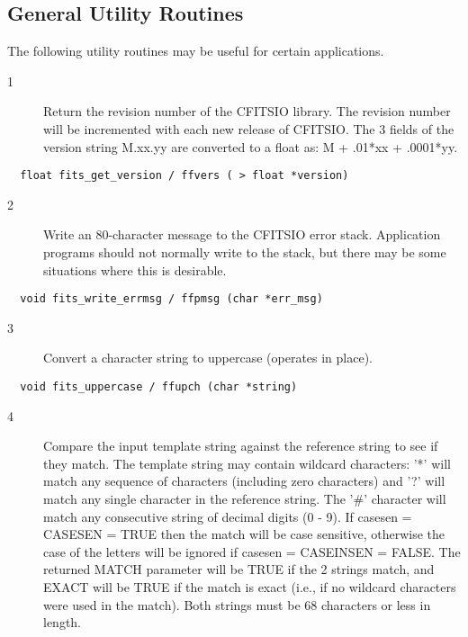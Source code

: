 \documentclass[11pt]{book}
\begin{document}
\subsection{General Utility Routines}

The following utility routines may be useful for certain applications.


\begin{description}
\item[1 ] Return the revision number of the CFITSIO library.
    The revision number will be incremented with each new
   release of CFITSIO. The 3 fields of the version string M.xx.yy
   are converted to a float as: M + .01*xx + .0001*yy. \label{ffvers}
\end{description}

\begin{verbatim}
  float fits_get_version / ffvers ( > float *version)
\end{verbatim}

\begin{description}
\item[2 ] Write an 80-character message to the CFITSIO error stack.  Application
    programs should not normally write to the stack, but there may be
   some situations where this is desirable. \label{ffpmsg}
\end{description}

\begin{verbatim}
  void fits_write_errmsg / ffpmsg (char *err_msg)
\end{verbatim}

\begin{description}
\item[3 ] Convert a character string to uppercase (operates in place). \label{ffupch}
\end{description}

\begin{verbatim}
  void fits_uppercase / ffupch (char *string)
\end{verbatim}

\begin{description}
\item[4 ] Compare the input template string against the reference string
    to see if they match.  The template string may contain wildcard
    characters: '*' will match any sequence of characters (including
    zero characters) and '?' will match any single character in the
    reference string.  The '\#' character will match any consecutive string
    of decimal digits (0 - 9).  If casesen = CASESEN = TRUE then the match will
    be case sensitive, otherwise the case of the letters will be ignored
    if casesen = CASEINSEN = FALSE.  The returned MATCH parameter will be
    TRUE if the 2 strings match, and EXACT will be TRUE if the match is
    exact (i.e., if no wildcard characters were used in the match).
   Both strings must be 68 characters or less in length. \label{ffcmps}
\end{description}
\end{document}
